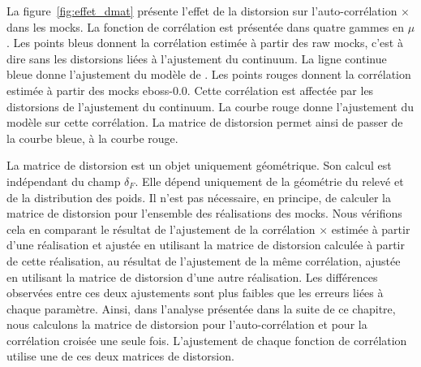 La figure~\ref{fig:effet_dmat} présente l'effet de la distorsion sur l'auto-corrélation \lya{}$\times$\lya{} dans les mocks. La fonction de corrélation est présentée dans quatre gammes en $\mu$. Les points bleus donnent la corrélation estimée à partir des raw mocks, c'est à dire sans les distorsions liées à l'ajustement du continuum. La ligne continue bleue donne l'ajustement du modèle de \picca{}. Les points rouges donnent la corrélation estimée à partir des mocks eboss-0.0. Cette corrélation est affectée par les distorsions de l'ajustement du continuum. La courbe rouge donne l'ajustement du modèle sur cette corrélation. La matrice de distorsion permet ainsi de passer de la courbe bleue, à la courbe rouge.

La matrice de distorsion est un objet uniquement géométrique. Son calcul est indépendant du champ $\delta_F$. Elle dépend uniquement de la géométrie du relevé et de la distribution des poids.
  Il n'est pas nécessaire, en principe, de calculer la matrice de distorsion pour l'ensemble des réalisations des mocks.
  Nous vérifions cela en comparant le résultat de l'ajustement de la corrélation \lya{}$\times$\lya{} estimée à partir d'une réalisation et ajustée en utilisant la matrice de distorsion calculée à partir de cette réalisation, au résultat de l'ajustement de la même corrélation, ajustée en utilisant la matrice de distorsion d'une autre réalisation. Les différences observées entre ces deux ajustements sont plus faibles que les erreurs liées à chaque paramètre.
Ainsi, dans l'analyse présentée dans la suite de ce chapitre, nous calculons la matrice de distorsion pour l'auto-corrélation et pour la corrélation croisée une seule fois. L'ajustement de chaque fonction de corrélation utilise une de ces deux matrices de distorsion.

